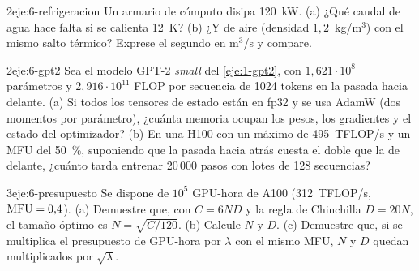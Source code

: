\begin{ejercicio}{2}{eje:6-refrigeracion}
Un armario de cómputo disipa 120~kW. (a) ¿Qué caudal de agua hace falta si se calienta 12~K? (b) ¿Y de aire (densidad $1{,}2$~kg/m$^{3}$) con el mismo salto térmico? Exprese el segundo en m$^{3}$/s y compare.
\end{ejercicio}

\begin{ejercicio}{2}{eje:6-gpt2}
Sea el modelo GPT-2 \emph{small} del \cref{eje:1-gpt2}, con $1{,}621\cdot 10^{8}$ parámetros y $2{,}916\cdot 10^{11}$ FLOP por secuencia de 1024 tokens en la pasada hacia delante. (a) Si todos los tensores de estado están en fp32 y se usa AdamW (dos momentos por parámetro), ¿cuánta memoria ocupan los pesos, los gradientes y el estado del optimizador? (b) En una H100 con un máximo de 495~TFLOP/s y un MFU del 50~\%, suponiendo que la pasada hacia atrás cuesta el doble que la de delante, ¿cuánto tarda entrenar 20\,000 pasos con lotes de 128 secuencias?
\end{ejercicio}

\begin{ejercicio}{3}{eje:6-presupuesto}
Se dispone de $10^{5}$ GPU-hora de A100 (312~TFLOP/s, $\mathrm{MFU}=0{,}4$). (a) Demuestre que, con $C=6ND$ y la regla de Chinchilla $D=20N$, el tamaño óptimo es $N=\sqrt{C/120}$. (b) Calcule $N$ y $D$. (c) Demuestre que, si se multiplica el presupuesto de GPU-hora por $\lambda$ con el mismo MFU, $N$ y $D$ quedan multiplicados por $\sqrt{\lambda}$.
\end{ejercicio}
